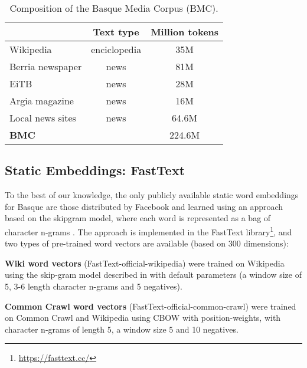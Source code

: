 \documentclass[10pt, a4paper]{article}
\begin{document}
\begin{table}[!ht]\small
\centering
\begin{tabular}{@{\hspace{0.3cm}}lcc} \hline
 {\textbf{}} & {\textbf{Text type}} & {\textbf{Million tokens}}  \\ \hline
Wikipedia & enciclopedia & 35M \\
Berria newspaper & news & 81M  \\
EiTB & news & 28M \\
Argia magazine & news & 16M \\
Local news sites & news &  64.6M \\ \hline
\hline
\textbf{BMC} & & 224.6M\\
\hline
\end{tabular}
\caption{Composition of the Basque Media Corpus (BMC).}\label{tab:corpus}
\end{table}


\subsection{Static Embeddings: FastText}\label{sec:build-basq-models:static}

To the best of our knowledge, the only publicly available static word embeddings for Basque are those distributed by Facebook and learned using an approach based on the skipgram model, where  each  word  is  represented as a bag of character n-grams \cite{fasttext1_bojanowski2017enriching}. The approach is implemented in the FastText library\footnote{\scriptsize \url{https://fasttext.cc/}}, and two types of pre-trained word vectors are available (based on 300 dimensions):

\textbf{Wiki word vectors} (FastText-official-wikipedia) were trained on Wikipedia using the skip-gram model described in \cite{fasttext1_bojanowski2017enriching} with default parameters (a window size of 5, 3-6 length character n-grams and 5 negatives).

\textbf{Common Crawl word vectors} (FastText-official-common-crawl) were trained on Common Crawl and Wikipedia using CBOW with position-weights, with character n-grams of length 5, a window size 5 and 10 negatives\cite{fasttext2_grave2018learning}.
\end{document}
